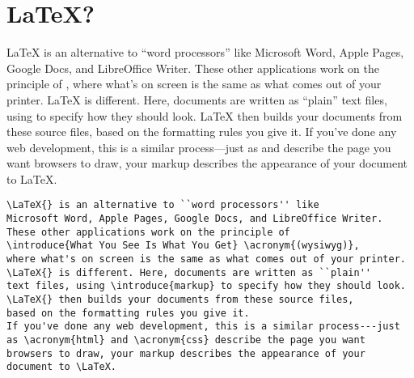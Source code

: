 \section{\texorpdfstring{\LaTeX}{LaTeX}?}
\LaTeX{} is an alternative to ``word processors'' like
Microsoft Word, Apple Pages, Google Docs, and LibreOffice Writer.
These other applications work on the principle of
 ,
where what's on screen is the same as what comes out of your printer.
\LaTeX{} is different. Here, documents are written as ``plain''
text files, using  to specify how they should look.
\LaTeX{} then builds your documents from these source files,
based on the formatting rules you give it.
If you've done any web development, this is a similar process---just
as  and  describe the page you want
browsers to draw, your markup describes the appearance of your
document to \LaTeX.

\vfill
\begin{leftfigure}
\begin{lstlisting}
\LaTeX{} is an alternative to ``word processors'' like
Microsoft Word, Apple Pages, Google Docs, and LibreOffice Writer.
These other applications work on the principle of
\introduce{What You See Is What You Get} \acronym{(wysiwyg)},
where what's on screen is the same as what comes out of your printer.
\LaTeX{} is different. Here, documents are written as ``plain''
text files, using \introduce{markup} to specify how they should look.
\LaTeX{} then builds your documents from these source files,
based on the formatting rules you give it.
If you've done any web development, this is a similar process---just
as \acronym{html} and \acronym{css} describe the page you want
browsers to draw, your markup describes the appearance of your
document to \LaTeX.
\end{lstlisting}
\end{leftfigure}
\vfill

